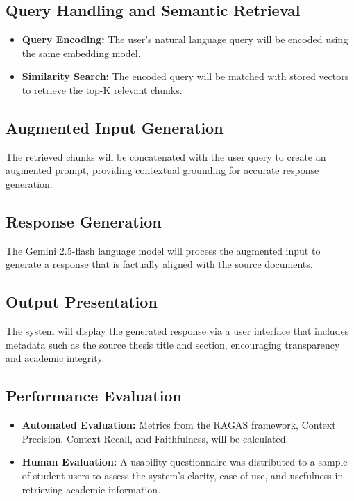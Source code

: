 \begin{refsection}
\subsection*{Query Handling and Semantic Retrieval}
\begin{itemize}
    \item \textbf{Query Encoding:} The user’s natural language query will be encoded using the same embedding model.
    \item \textbf{Similarity Search:} The encoded query will be matched with stored vectors to retrieve the top-K relevant chunks.
\end{itemize}

\subsection*{Augmented Input Generation}
The retrieved chunks will be concatenated with the user query to create an augmented prompt, providing contextual grounding for accurate response generation.

\subsection*{Response Generation}
The Gemini 2.5-flash language model will process the augmented input to generate a response that is factually aligned with the source documents.

\subsection*{Output Presentation}
The system will display the generated response via a user interface that includes metadata such as the source thesis title and section, encouraging transparency and academic integrity.

\subsection*{Performance Evaluation}
\begin{itemize}
    \item \textbf{Automated Evaluation:} Metrics from the RAGAS framework, Context Precision, Context Recall, and Faithfulness, will be calculated.
    \item \textbf{Human Evaluation:} A usability questionnaire was distributed to a sample of student users to assess the system’s clarity, ease of use, and usefulness in retrieving academic information.
\end{itemize}


\end{refsection}
